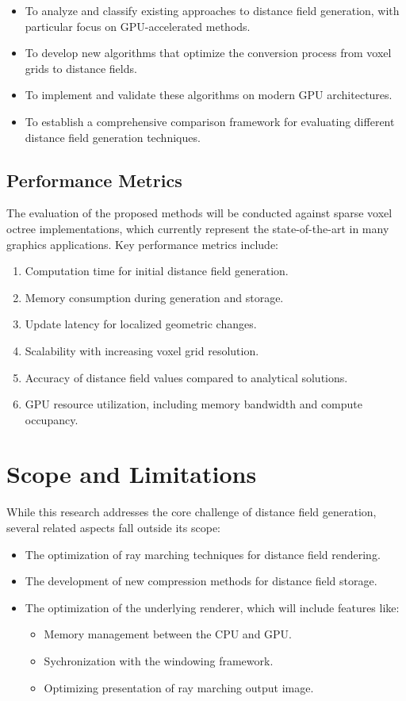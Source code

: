 \begin{itemize}
  \item To analyze and classify existing approaches to distance field generation, with particular focus on
        GPU-accelerated methods.
  \item To develop new algorithms that optimize the conversion process from voxel grids to distance fields.
  \item To implement and validate these algorithms on modern GPU architectures.
  \item To establish a comprehensive comparison framework for evaluating different distance field generation techniques.
\end{itemize}

\subsection{Performance Metrics}
The evaluation of the proposed methods will be conducted against sparse voxel octree implementations, which currently
represent the state-of-the-art in many graphics applications. Key performance metrics include:

\begin{enumerate}
  \item Computation time for initial distance field generation.
  \item Memory consumption during generation and storage.
  \item Update latency for localized geometric changes.
  \item Scalability with increasing voxel grid resolution.
  \item Accuracy of distance field values compared to analytical solutions.
  \item GPU resource utilization, including memory bandwidth and compute occupancy.
\end{enumerate}

\section{Scope and Limitations}
While this research addresses the core challenge of distance field generation, several related aspects fall outside its
scope:

\begin{itemize}
  \item The optimization of ray marching techniques for distance field rendering.
  \item The development of new compression methods for distance field storage.
  \item The optimization of the underlying renderer, which will include features like:

        \begin{itemize}
          \item Memory management between the CPU and GPU.\@
          \item Sychronization with the windowing framework.
          \item Optimizing presentation of ray marching output image.
        \end{itemize}
\end{itemize}

